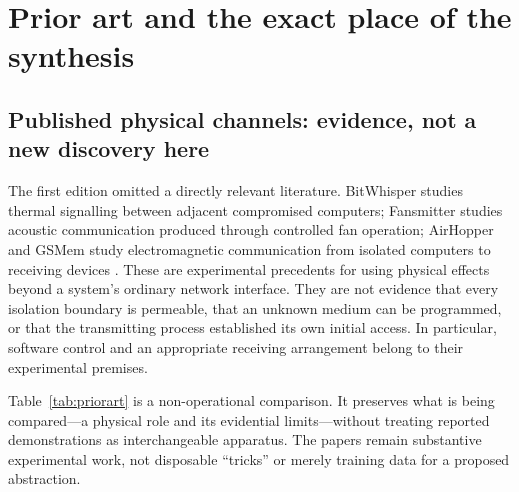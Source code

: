 \section{Prior art and the exact place of the synthesis}\label{sec:related}
\subsection{Published physical channels: evidence, not a new discovery here}
The first edition omitted a directly relevant literature. BitWhisper studies thermal signalling between adjacent compromised computers; Fansmitter studies acoustic communication produced through controlled fan operation; AirHopper and GSMem study electromagnetic communication from isolated computers to receiving devices \citep{bitwhisper,fansmitter,airhopper,gsmem}. These are experimental precedents for using physical effects beyond a system's ordinary network interface. They are not evidence that every isolation boundary is permeable, that an unknown medium can be programmed, or that the transmitting process established its own initial access. In particular, software control and an appropriate receiving arrangement belong to their experimental premises.

Table~\ref{tab:priorart} is a non-operational comparison. It preserves what is being compared---a physical role and its evidential limits---without treating reported demonstrations as interchangeable apparatus. The papers remain substantive experimental work, not disposable ``tricks'' or merely training data for a proposed abstraction.

